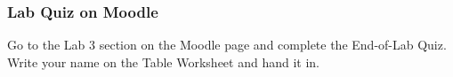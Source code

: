 \documentclass[main.tex]{subfiles}
\begin{document}
\subsubsection{Lab Quiz on Moodle}
Go to the Lab 3 section on the Moodle page and complete the End-of-Lab Quiz. Write your name on the Table Worksheet and hand it in.


\end{document}
